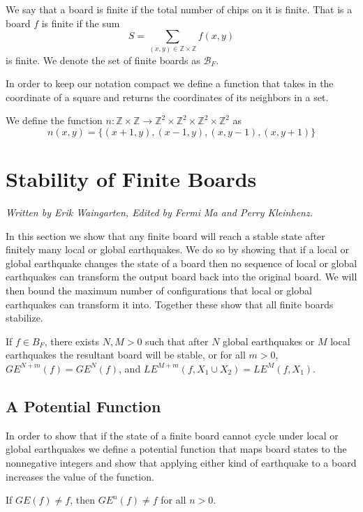 \documentclass[runningheads,a4paper]{llncs}
\begin{document}
\begin{definition} 
We say that a board is finite if the total number of chips on it is finite. That is a board $f$ is finite if the sum
\begin{equation}
S= \sum_{(x,y) \in \mathbb{Z} \times \mathbb{Z}} f(x,y) 
\end{equation}
is finite. 
We denote the set of finite boards as $\mathcal{B}_F$.
\end{definition}

In order to keep our notation compact we define a function that takes in the coordinate of a square and returns the coordinates of its neighbors in a set. 
\begin{definition}
We define the function $n: \mathbb{Z} \times \mathbb{Z} \rightarrow \mathbb{Z}^2 \times \mathbb{Z}^2 \times \mathbb{Z}^2 \times \mathbb{Z}^2 $ as 
\begin{equation}
n(x,y) = \{ (x+1, y), (x-1, y), (x, y-1), (x, y+1) \}
\end{equation}
\end{definition}

\section{Stability of Finite Boards}
\label{Stability of Finite Boards}
\emph{Written by Erik Waingarten, Edited by Fermi Ma and Perry Kleinhenz.}

In this section we show that any finite board will reach a stable state after finitely many local or global earthquakes. 
We do so by showing that if a local or global earthquake changes the state of a board then no sequence of local or global earthquakes can transform the output board back into the original board. 
We will then bound the maximum number of configurations that local or global earthquakes can transform it into. 
Together these show that all finite boards stabilize. 
\begin{theorem}
\label{finitestability}
If $f \in B_F$, there exists $N, M > 0$ such that after $N$ global earthquakes or $M$ local earthquakes the resultant board will be stable, or for all $m > 0$, $GE^{N+m}(f) = GE^N(f)$, and $LE^{M+m}(f, X_1 \cup X_2) = LE^M(f, X_1)$.
\end{theorem}

\subsection{A Potential Function}
In order to show that if the state of a finite board cannot cycle under local or global earthquakes we define a potential function that maps board states to the nonnegative integers and show that applying either kind of earthquake to a board increases the value of the function. 
\begin{lemma}
If $GE(f) \neq f$, then $GE^n(f) \neq f$ for all $n > 0$.
\end{lemma}
\end{document}
